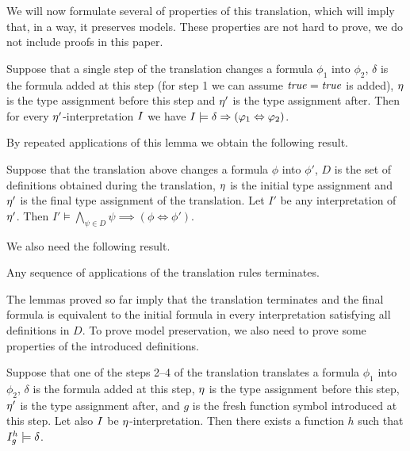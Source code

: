 We will now formulate several of properties of this translation, which will imply that, in a way, it preserves models. These properties are not hard to prove, we do not include proofs in this paper.

\begin{lemma}\label{lemma:step-preserves-equivalence}\rm
  Suppose that a single step of the translation changes a formula $\phi_1$ into $\phi_2$, $\delta$ is the formula added at this step (for step 1 we can assume $\mathit{true}=\mathit{true}$ is added), $\eta$ is the type assignment before this step and $\eta'$ is the type assignment after. Then for every $\eta'$-interpretation $I$ we have $I \models \delta \Rightarrow (\varphi_1 \Leftrightarrow \varphi_2)$. \QED
\end{lemma}

By repeated applications of this lemma we obtain the following result.

\begin{lemma}\label{lemma:definitions-preserve-models}\rm
  Suppose that the translation above changes a formula $\phi$ into $\phi'$, $D$ is the set of definitions obtained during the translation, $\eta$ is the initial type assignment and $\eta'$ is the final type assignment of the translation. Let $I'$ be any interpretation of $\eta'$. Then $I' \models \bigwedge_{\psi \in D} \psi \implies (\phi \Leftrightarrow \phi')$. \QED
\end{lemma}

We also need the following result.

\begin{lemma}\label{lem:termination}\rm
  Any sequence of applications of the translation rules terminates. \QED
\end{lemma}

The lemmas proved so far imply that the translation terminates and the final formula is equivalent to the initial formula in every interpretation satisfying all definitions in $D$. To prove model preservation, we also need to prove some properties of the introduced definitions. 

\begin{lemma}\label{lem:satisfy:definitions}\rm
  Suppose that one of the steps 2--4 of the translation translates a formula $\phi_1$ into $\phi_2$, $\delta$ is the formula added at this step, $\eta$ is the type assignment before this step, $\eta'$ is the type assignment after, and $g$ is the fresh function symbol introduced at this step. Let also $I$ be $\eta$-interpretation. Then there exists a function $h$ such that ${I}_{g}^{h} \models \delta$. \QED
\end{lemma}

